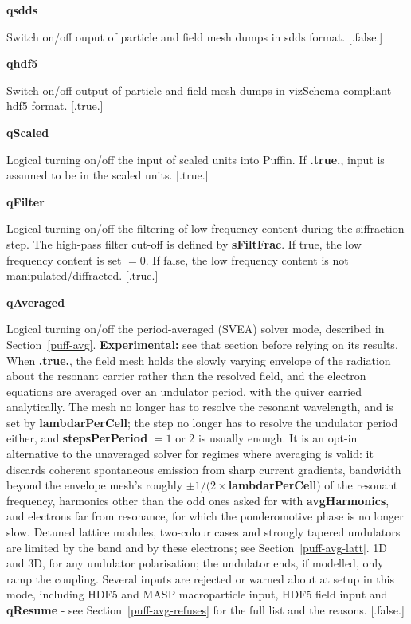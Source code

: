 \documentclass[12pt]{article}%
\begin{document}
{\bf qsdds}

Switch on/off ouput of particle and field mesh dumps in sdds format. [.false.]

{\bf qhdf5}

Switch on/off output of particle and field mesh dumps in vizSchema compliant hdf5 format. [.true.]

{\bf qScaled}

Logical turning on/off the input of scaled units into Puffin. If {\bf .true.}, input is assumed to be in the scaled units. [.true.]

{\bf qFilter}

Logical turning on/off the filtering of low frequency content during the siffraction step. The high-pass filter cut-off is defined by {\bf sFiltFrac}. If true, the low frequency content is set $=0$. If false, the low frequency content is not manipulated/diffracted. [.true.]

{\bf qAveraged}

Logical turning on/off the period-averaged (SVEA) solver mode, described in Section~\ref{puff-avg}. {\bf Experimental:} see that section before relying on its results. When {\bf .true.}, the field mesh holds the slowly varying envelope of the radiation about the resonant carrier rather than the resolved field, and the electron equations are averaged over an undulator period, with the quiver carried analytically. The mesh no longer has to resolve the resonant wavelength, and is set by {\bf lambdarPerCell}; the step no longer has to resolve the undulator period either, and {\bf stepsPerPeriod} $=1$ or $2$ is usually enough. It is an opt-in alternative to the unaveraged solver for regimes where averaging is valid: it discards coherent spontaneous emission from sharp current gradients, bandwidth beyond the envelope mesh's roughly $\pm 1/(2\times${\bf lambdarPerCell}$)$ of the resonant frequency, harmonics other than the odd ones asked for with {\bf avgHarmonics}, and electrons far from resonance, for which the ponderomotive phase is no longer slow. Detuned lattice modules, two-colour cases and strongly tapered undulators are limited by the band and by these electrons; see Section~\ref{puff-avg-latt}. 1D and 3D, for any undulator polarisation; the undulator ends, if modelled, only ramp the coupling. Several inputs are rejected or warned about at setup in this mode, including HDF5 and MASP macroparticle input, HDF5 field input and {\bf qResume} - see Section~\ref{puff-avg-refuses} for the full list and the reasons. [.false.]
\end{document}

